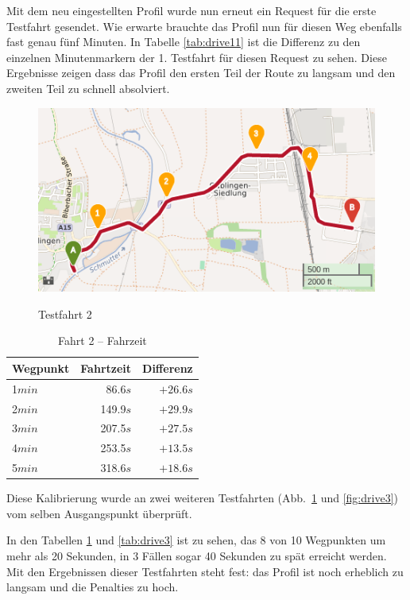 Mit dem neu eingestellten Profil wurde nun erneut ein Request für die erste Testfahrt gesendet.
Wie erwarte brauchte das Profil nun für diesen Weg ebenfalls fast genau fünf Minuten.
In Tabelle \ref{tab:drive11} ist die Differenz zu den einzelnen Minutenmarkern der 1. Testfahrt für diesen Request zu sehen.
Diese Ergebnisse zeigen dass das Profil den ersten Teil der Route zu langsam und den zweiten Teil zu schnell absolviert.

\begin{figure}[htb]
\centering
\caption{Testfahrt 2}
\label{fig:drive2}
\includegraphics[width = 0.70 \textwidth]{../media/Fahrt2crop.png} \\
\end{figure}

\begin{table}[htb]
\centering
\caption{Fahrt 2 -- Fahrzeit}
\label{tab:drive2}
\begin{tabular}{|l|r|r|}
\hline
Wegpunkt & Fahrtzeit & Differenz \\ \hline 
1$min$ & 86.6$s$ & $+26.6s$ \\
2$min$ & 149.9$s$ & $+29.9s$ \\
3$min$ & 207.5$s$ & $+27.5s$ \\
4$min$ & 253.5$s$ & $+13.5s$ \\
5$min$ & 318.6$s$ & $+18.6s$ \\
\hline
\end{tabular}
\end{table}


Diese Kalibrierung wurde an zwei weiteren Testfahrten (Abb.~\ref{fig:drive2} und \ref{fig:drive3}) vom selben Ausgangspunkt überprüft.

In den Tabellen \ref{tab:drive2} und \ref{tab:drive3} ist zu sehen, das 8 von 10 Wegpunkten um mehr als 20 Sekunden, in 3 Fällen sogar 40 Sekunden zu spät erreicht werden.
Mit den Ergebnissen dieser Testfahrten steht fest: das Profil ist noch erheblich zu langsam und die Penalties zu hoch.

